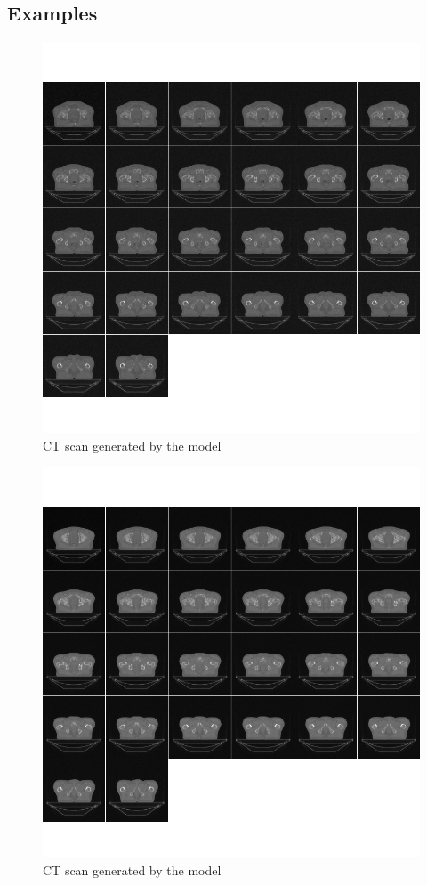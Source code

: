 \documentclass[11pt,a4paper]{report}
\begin{document}
\subsection{Examples}
\begin{figure}[H]
	\centering
	\includegraphics[scale=0.5]{images/generatedData1}
    \caption{CT scan generated by the model}
\end{figure}
\begin{figure}[H]
	\centering
	\includegraphics[scale=0.5]{images/generatedData2}
    \caption{CT scan generated by the model}
\end{figure}
\end{document}
